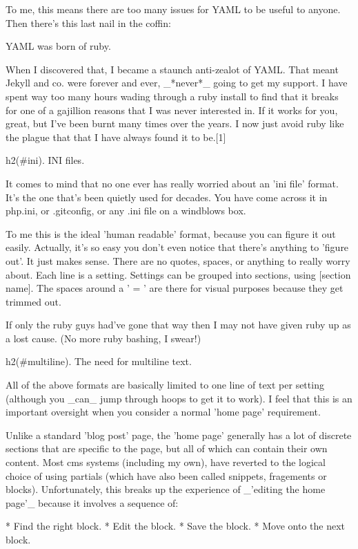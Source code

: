 To me, this means there are too many issues for YAML to be useful to anyone. Then there's this last nail in the coffin:

YAML was born of ruby. 

When I discovered that, I became a staunch anti-zealot of YAML. That meant Jekyll and co. were forever and ever, _*never*_ going to get my support. I have spent way too many hours wading through a ruby install to find that it breaks for one of a gajillion reasons that I was never interested in. If it works for you, great, but I've been burnt many times over the years. I now just avoid ruby like the plague that that I have always found it to be.[1]

h2(#ini). INI files.

It comes to mind that no one ever has really worried about an 'ini file' format. It's the one that's been quietly used for decades. You have come across it in php.ini, or .gitconfig, or any .ini file on a windblows box.


To me this is the ideal 'human readable' format, because you can figure it out easily. Actually, it's so easy you don't even notice that there's anything to 'figure out'. It just makes sense. There are no quotes, spaces, or anything to really worry about. Each line is a setting. Settings can be grouped into sections, using [section name]. The spaces around a ' = ' are there for visual purposes because they get trimmed out. 

If only the ruby guys had've gone that way then I may not have given ruby up as a lost cause. (No more ruby bashing, I swear!)

h2(#multiline). The need for multiline text.

All of the above formats are basically limited to one line of text per setting (although you _can_ jump through hoops to get it to work). I feel that this is an important oversight when you consider a normal 'home page' requirement. 

Unlike a standard 'blog post' page, the 'home page' generally has a lot of discrete sections that are specific to the page, but all of which can contain their own content. Most cms systems (including my own), have reverted to the logical choice of using partials (which have also been called snippets, fragements or blocks). Unfortunately, this breaks up the experience of _'editing the home page'_ because it involves a sequence of:

* Find the right block.
* Edit the block.
* Save the block.
* Move onto the next block.

